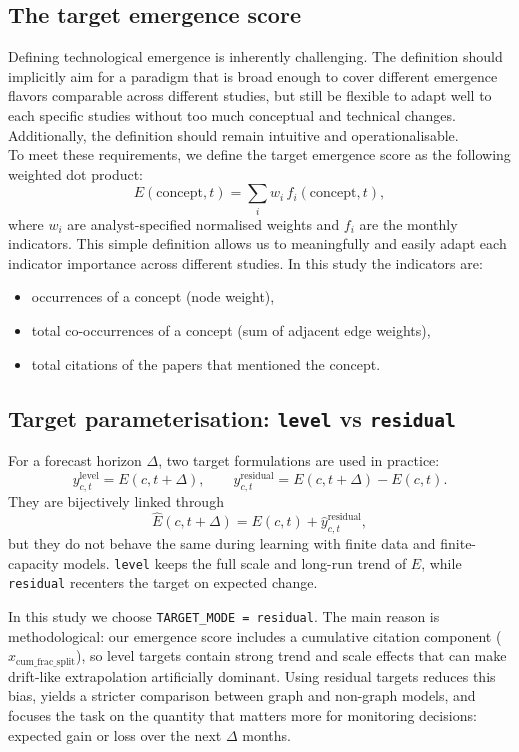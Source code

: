 \documentclass[pdflatex,sn-basic]{sn-jnl}
\begin{document}
\subsection{The target emergence score}
Defining technological emergence is inherently challenging.
The definition should implicitly aim for a paradigm that is broad enough to cover different emergence flavors comparable across different studies, but still be flexible to adapt well to each specific studies without too much conceptual and technical changes.
Additionally, the definition should remain intuitive and operationalisable.\\
To meet these requirements, we define the target emergence score as the following weighted dot product:
\[
E(\text{concept}, t) = \sum_{i} w_i \, f_i(\text{concept}, t),
\]
where $w_i$ are analyst-specified normalised weights and $f_i$ are the monthly indicators. This simple definition allows us to meaningfully and easily adapt each indicator importance across different studies. In this study the indicators are:
\begin{itemize}
    \item occurrences of a concept (node weight),
    \item total co-occurrences of a concept (sum of adjacent edge weights),
    \item total citations of the papers that mentioned the concept.
\end{itemize} 

\subsection{Target parameterisation: \texttt{level} vs \texttt{residual}}
For a forecast horizon \(\Delta\), two target formulations are used in practice:
\[
y^{\text{level}}_{c,t}=E(c,t+\Delta),
\qquad
y^{\text{residual}}_{c,t}=E(c,t+\Delta)-E(c,t).
\]
They are bijectively linked through
\[
\widehat{E}(c,t+\Delta)=E(c,t)+\widehat{y}^{\text{residual}}_{c,t},
\]
but they do not behave the same during learning with finite data and finite-capacity models. \texttt{level} keeps the full scale and long-run trend of \(E\), while \texttt{residual} recenters the target on expected change.

In this study we choose \texttt{TARGET\_MODE = residual}.
The main reason is methodological: our emergence score includes a cumulative citation component (\(x_{\text{cum\_frac\_split}}\)), so level targets contain strong trend and scale effects that can make drift-like extrapolation artificially dominant.
Using residual targets reduces this bias, yields a stricter comparison between graph and non-graph models, and focuses the task on the quantity that matters more for monitoring decisions: expected gain or loss over the next \(\Delta\) months.
\end{document}

